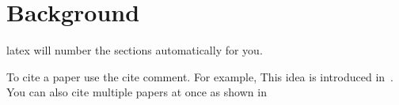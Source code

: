 \section{Background}
latex will number the sections automatically for you.

To cite a paper use the cite comment. For example, This
idea is introduced in~\cite{tosuncikm2002}. You can also
cite multiple papers at once as shown 
in~\cite{tosunicme2000,tosuncikm2002,tosunitcc2001,tosunMM01}
